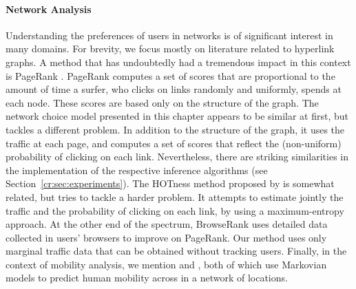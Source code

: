 \paragraph{Network Analysis}
Understanding the preferences of users in networks is of significant interest in many domains.
For brevity, we focus mostly on literature related to hyperlink graphs.
A method that has undoubtedly had a tremendous impact in this context is PageRank \citep{brin1998anatomy}.
PageRank computes a set of scores that are proportional to the amount of time a surfer, who clicks on links randomly and uniformly, spends at each node.
These scores are based only on the structure of the graph.
The network choice model presented in this chapter appears to be similar at first, but tackles a different problem.
In addition to the structure of the graph, it uses the traffic at each page, and computes a set of scores that reflect the (non-uniform) probability of clicking on each link.
Nevertheless, there are striking similarities in the implementation of the respective inference algorithms (see Section~\ref{cr:sec:experiments}).
The HOTness method proposed by \citet{tomlin2003new} is somewhat related, but tries to tackle a harder problem.
It attempts to estimate jointly the traffic and the probability of clicking on each link, by using a maximum-entropy approach.
At the other end of the spectrum, BrowseRank \citep{liu2008browserank} uses detailed data collected in users' browsers to improve on PageRank.
Our method uses only marginal traffic data that can be obtained without tracking users.
Finally, in the context of mobility analysis, we mention \citet{ashbrook2003using} and \citet{kafsi2015traveling}, both of which use Markovian models to predict human mobility across in a network of locations.
